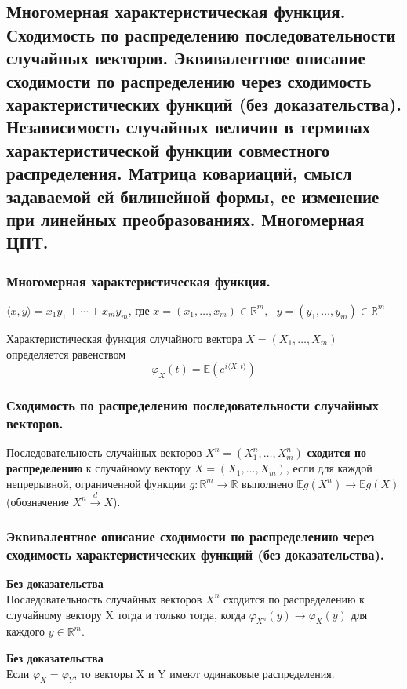 \newcommand{\cov}{\operatorname{cov}}

    \subsection{Многомерная характеристическая функция. Сходимость по распределению последовательности случайных векторов. Эквивалентное описание сходимости по распределению через сходимость характеристических функций (без доказательства). Независимость случайных величин в терминах характеристической функции совместного распределения. Матрица ковариаций, смысл задаваемой ей билинейной формы, ее изменение при линейных преобразованиях. Многомерная ЦПТ.}
    \subsubsection{Многомерная характеристическая функция.}
    \begin{designation}
        $\langle x, y \rangle = x_1y_1 + \cdots + x_my_m$, где $ x = (x_1, \ldots , x_m)\in \mathbb{R}^m,\text{ } y = (y_1, \ldots , y_m)\in \mathbb{R}^m$
    \end{designation}
    \begin{definition}
        Характеристическая функция случайного вектора $ X = (X_1, \ldots , X_m)\ $ определяется равенством
        $$\varphi_{X}(t) = \mathbb{E}(e^{i\langle X, t \rangle})$$
    \end{definition}
    \subsubsection{Сходимость по распределению последовательности случайных векторов.}
    \begin{definition}
        Последовательность случайных векторов $ X^n = (X^n_1, \ldots, X^n_m) $ \textbf{сходится по распределению} к случайному вектору $ X = (X_1,\ldots, X_m) $, если для каждой непрерывной, ограниченной функции $ g : \mathbb{R}^m\to \mathbb{R} $ выполнено $ \mathbb{E}g(X^n)\to \mathbb{E}g(X) $ (обозначение $ X^n \xrightarrow{d} X $).
    \end{definition}
    \subsubsection{Эквивалентное описание сходимости по распределению через сходимость характеристических функций (без доказательства).}
    \begin{theorem}
        \textbf{Без доказательства}\\
        Последовательность случайных векторов $ X^n $ сходится по распределению к случайному вектору X тогда и только тогда, когда $ \varphi_{X^n}(y)\to\varphi_X(y) $ для каждого $ y \in \mathbb{R}^m $.
    \end{theorem}
    \begin{corollary}
        \textbf{Без доказательства}\\
        Если $ \varphi_X = \varphi_Y $, то векторы X и Y имеют одинаковые распределения.
    \end{corollary}
